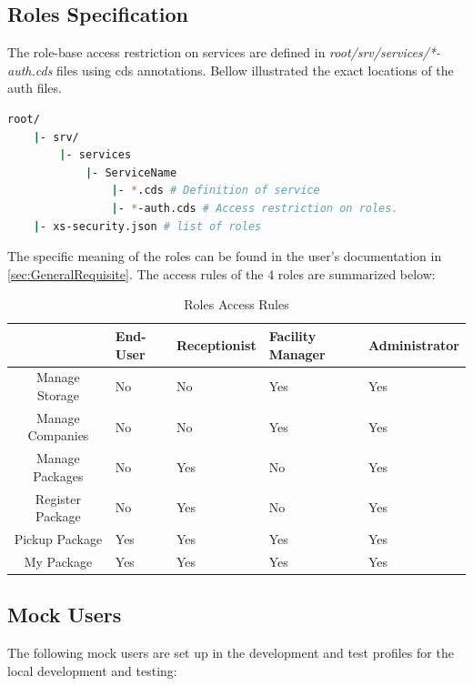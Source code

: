 \subsection{Roles Specification}
The role-base access restriction on services are defined in \textit{root/srv/services/*-auth.cds} files using cds annotations. Bellow illustrated the exact locations of the auth files.

\begin{lstlisting}[language={bash}]
root/
    |- srv/
        |- services
            |- ServiceName 
                |- *.cds # Definition of service
                |- *-auth.cds # Access restriction on roles.
    |- xs-security.json # list of roles
\end{lstlisting}

The specific meaning of the roles can be found in the user's documentation in \autoref{sec:GeneralRequisite}. The access rules of the 4 roles are summarized below:

\begin{table}[H]
    \centering
    \begin{tabular}{|c|m{2.1cm}|m{2.1cm}|m{2.1cm}|m{2.5cm}|} \hline 
         & End-User & Receptionist & Facility Manager & Administrator     \\ \hline 
         Manage Storage          & No & No & Yes & Yes \\ \hline 
         Manage Companies         & No & No & Yes & Yes \\ \hline 
         Manage Packages          & No & Yes & No  & Yes \\ \hline 
         Register Package       & No & Yes & No  & Yes \\ \hline 
         Pickup Package           & Yes & Yes & Yes & Yes \\ \hline
         My Package               & Yes & Yes & Yes & Yes \\ \hline
    \end{tabular}
    \caption{Roles Access Rules}
    \label{tab:Access Rule}
\end{table}
\subsection{Mock Users}

The following mock users are set up in the development and test profiles for the local development and testing:

